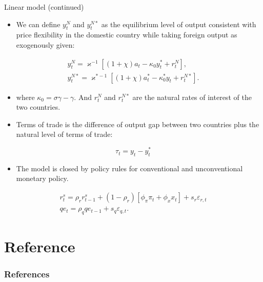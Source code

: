 \documentclass[10pt]{beamer}
\begin{document}
\begin{frame}{Linear model (continued)}

\begin{itemize}
    \item We can define $y_{t}^{N}$ and $y_{t}^{N *}$ as the equilibrium level of output consistent with price flexibility in the domestic country while taking foreign output as exogenously given:
\end{itemize}

$$
\begin{gathered}
y_{t}^{N}=\varkappa^{-1}\left[(1+\chi) a_{t}-\kappa_{0} y_{t}^{*}+r_t^N\right], \\
y_{t}^{N *}=\varkappa^{*-1}\left[(1+\chi) a_{t}^{*}-\kappa_{0}^{*} y_{t}+r_t^{N*}\right] .
\end{gathered}
$$



\begin{itemize}
    \item where $\kappa_{0}=\sigma \gamma-\gamma$. And $r_{t}^{N}$ and $r_{t}^{N *}$ are the natural rates of interest of the two countries.
\end{itemize}

\begin{itemize}
    \item Terms of trade is the difference of output gap between two countries plus the natural level of terms of trade:
\end{itemize}


$$
\tau_{t}=y_{t}-y_{t}^{*}
$$
\begin{itemize}
    \item The model is closed by policy rules for conventional and unconventional monetary policy.
\end{itemize}


$$
\begin{gathered}
r_{t}^{s}=\rho_{r} r_{t-1}^{s}+\left(1-\rho_{r}\right)\left[\phi_{\pi} \pi_{t}+\phi_{x} x_{t}\right]+s_{r} \varepsilon_{r, t} \\
q e_{t}=\rho_{q} q e_{t-1}+s_{q} \varepsilon_{q, t} .
\end{gathered}
$$
\end{frame}

\section*{Reference}

\begin{frame}[allowframebreaks]
	\frametitle{References}
	
	\footnotesize
	
\end{frame}
\end{document}
